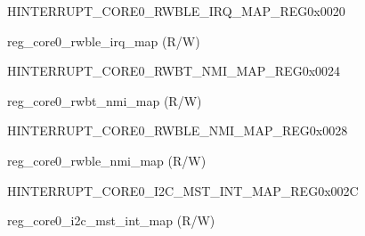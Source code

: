 \begin{register}{H}{INTERRUPT\_CORE0\_RWBLE\_IRQ\_MAP\_REG}{0x0020}\label{regdesc:INTERRUPTCORE0RWBLEIRQMAPREG}
%
%
\regnewline%
\begin{regdesc}\begin{reglist}
\label{fielddesc:INTERRUPTCORE0RWBLEIRQMAP}\item [INTERRUPT\_CORE0\_RWBLE\_IRQ\_MAP] reg\_core0\_rwble\_irq\_map (R/W)
\end{reglist}\end{regdesc}
\end{register}


\begin{register}{H}{INTERRUPT\_CORE0\_RWBT\_NMI\_MAP\_REG}{0x0024}\label{regdesc:INTERRUPTCORE0RWBTNMIMAPREG}
%
%
\regnewline%
\begin{regdesc}\begin{reglist}
\label{fielddesc:INTERRUPTCORE0RWBTNMIMAP}\item [INTERRUPT\_CORE0\_RWBT\_NMI\_MAP] reg\_core0\_rwbt\_nmi\_map (R/W)
\end{reglist}\end{regdesc}
\end{register}


\begin{register}{H}{INTERRUPT\_CORE0\_RWBLE\_NMI\_MAP\_REG}{0x0028}\label{regdesc:INTERRUPTCORE0RWBLENMIMAPREG}
%
%
\regnewline%
\begin{regdesc}\begin{reglist}
\label{fielddesc:INTERRUPTCORE0RWBLENMIMAP}\item [INTERRUPT\_CORE0\_RWBLE\_NMI\_MAP] reg\_core0\_rwble\_nmi\_map (R/W)
\end{reglist}\end{regdesc}
\end{register}


\begin{register}{H}{INTERRUPT\_CORE0\_I2C\_MST\_INT\_MAP\_REG}{0x002C}\label{regdesc:INTERRUPTCORE0I2CMSTINTMAPREG}
%
%
\regnewline%
\begin{regdesc}\begin{reglist}
\label{fielddesc:INTERRUPTCORE0I2CMSTINTMAP}\item [INTERRUPT\_CORE0\_I2C\_MST\_INT\_MAP] reg\_core0\_i2c\_mst\_int\_map (R/W)
\end{reglist}\end{regdesc}
\end{register}


